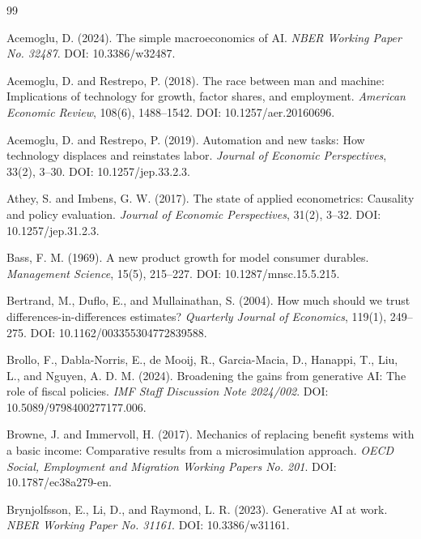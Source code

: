 \documentclass[11pt,a4paper]{article}
\begin{document}
\begin{thebibliography}{99}

Acemoglu, D. (2024).
\newblock The simple macroeconomics of AI.
\newblock \emph{NBER Working Paper No. 32487}. DOI: 10.3386/w32487.

Acemoglu, D. and Restrepo, P. (2018).
\newblock The race between man and machine: Implications of technology for growth, factor shares, and employment.
\newblock \emph{American Economic Review}, 108(6), 1488--1542. DOI: 10.1257/aer.20160696.

Acemoglu, D. and Restrepo, P. (2019).
\newblock Automation and new tasks: How technology displaces and reinstates labor.
\newblock \emph{Journal of Economic Perspectives}, 33(2), 3--30. DOI: 10.1257/jep.33.2.3.


Athey, S. and Imbens, G. W. (2017).
\newblock The state of applied econometrics: Causality and policy evaluation.
\newblock \emph{Journal of Economic Perspectives}, 31(2), 3--32. DOI: 10.1257/jep.31.2.3.

Bass, F. M. (1969).
\newblock A new product growth for model consumer durables.
\newblock \emph{Management Science}, 15(5), 215--227. DOI: 10.1287/mnsc.15.5.215.

Bertrand, M., Duflo, E., and Mullainathan, S. (2004).
\newblock How much should we trust differences-in-differences estimates?
\newblock \emph{Quarterly Journal of Economics}, 119(1), 249--275. DOI: 10.1162/003355304772839588.

Brollo, F., Dabla-Norris, E., de Mooij, R., Garcia-Macia, D., Hanappi, T., Liu, L., and Nguyen, A. D. M. (2024).
\newblock Broadening the gains from generative AI: The role of fiscal policies.
\newblock \emph{IMF Staff Discussion Note 2024/002}. DOI: 10.5089/9798400277177.006.

Browne, J. and Immervoll, H. (2017).
\newblock Mechanics of replacing benefit systems with a basic income: Comparative results from a microsimulation approach.
\newblock \emph{OECD Social, Employment and Migration Working Papers No. 201}. DOI: 10.1787/ec38a279-en.

Brynjolfsson, E., Li, D., and Raymond, L. R. (2023).
\newblock Generative AI at work.
\newblock \emph{NBER Working Paper No. 31161}. DOI: 10.3386/w31161.


\end{thebibliography}
\end{document}
